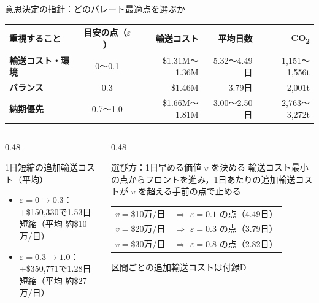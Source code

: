 \documentclass[aspectratio=169,11pt]{beamer}
\begin{document}
\begin{frame}{意思決定の指針：どのパレート最適点を選ぶか}
\footnotesize
\vspace*{-2mm}
\begin{center}
\begin{tabular}{>{\bfseries}l c r r r}
\toprule
\rowcolor{LightBlue}
\textbf{重視すること} & 目安の点（$\varepsilon$） & 輸送コスト & 平均日数 & CO\textsubscript{2}\\
\midrule
輸送コスト・環境 & 0〜0.1 & \$1.31M〜1.36M & 5.32〜4.49日 & 1,151〜1,556t\\
バランス & 0.3 & \$1.46M & 3.79日 & 2,001t\\
納期優先 & 0.7〜1.0 & \$1.66M〜1.81M & 3.00〜2.50日 & 2,763〜3,272t\\
\bottomrule
\end{tabular}
\end{center}
\vspace{2mm}
\begin{columns}[T,totalwidth=\textwidth]
\begin{column}{0.48\textwidth}
\begin{block}{1日短縮の追加輸送コスト（平均）}
\footnotesize
\begin{itemize}
\item $\varepsilon=0\to0.3$：+\$150,330で1.53日短縮\newline（平均 約\$10万/日）
\item $\varepsilon=0.3\to1.0$：+\$350,771で1.28日短縮\newline（平均 約\$27万/日）
\end{itemize}
\end{block}
\end{column}
\begin{column}{0.48\textwidth}
\begin{block}{選び方：1日早める価値 $v$ を決める}
\footnotesize
輸送コスト最小の点からフロントを進み，\newline 1日あたりの追加輸送コストが $v$ を\newline 超える手前の点で止める\par
\begin{tabular}{@{}l l@{}}
$v=$\$10万/日 & $\Rightarrow$ $\varepsilon=0.1$ の点（4.49日）\\
$v=$\$20万/日 & $\Rightarrow$ $\varepsilon=0.3$ の点（3.79日）\\
$v=$\$30万/日 & $\Rightarrow$ $\varepsilon=0.8$ の点（2.82日）\\
\end{tabular}\par
{\scriptsize\color{BlueText!70} 区間ごとの追加輸送コストは付録D\par}
\end{block}
\end{column}
\end{columns}
\end{frame}
\end{document}
